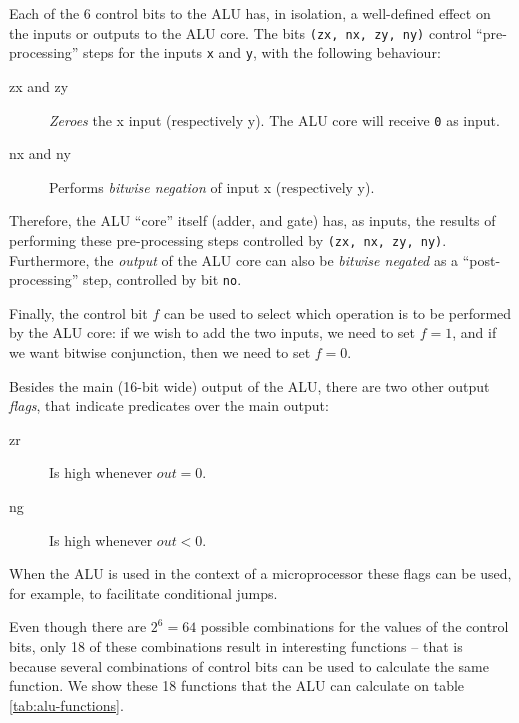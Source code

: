 \documentclass[a4paper]{article}
\begin{document}
            Each of the 6 control bits to the ALU has, in isolation, a well-defined effect on the
            inputs or outputs to the ALU core. The bits \texttt{(zx, nx, zy, ny)} control
            ``pre-processing'' steps for the inputs \texttt{x} and \texttt{y}, with the following
            behaviour:
            \begin{description}
                \item[zx and zy] \emph{Zeroes} the x input (respectively y). The ALU core will
                    receive \texttt{0} as input.
                \item[nx and ny] Performs \emph{bitwise negation} of input x (respectively y).
            \end{description}

            Therefore, the ALU ``core'' itself (adder, and gate) has, as inputs, the results of
            performing these pre-processing steps controlled by \texttt{(zx, nx, zy, ny)}.
            Furthermore, the \emph{output} of the ALU core can also be \emph{bitwise negated} as a
            ``post-processing'' step, controlled by bit \texttt{no}.

            Finally, the control bit $f$ can be used to select which operation is to be performed by
            the ALU core: if we wish to add the two inputs, we need to set $f = 1$, and if we want
            bitwise conjunction, then we need to set $f = 0$.

            Besides the main (16-bit wide) output of the ALU, there are two other output
            \emph{flags}, that indicate predicates over the main output:
            \begin{description}
                \item[zr] Is high whenever $out = 0$.
                \item[ng] Is high whenever $out < 0$.
            \end{description}

            When the ALU is used in the context of a microprocessor these flags can be used, for
            example, to facilitate conditional jumps.

            Even though there are $2^{6} = 64$ possible combinations for the values of the control
            bits, only 18 of these combinations result in interesting functions -- that is because
            several combinations of control bits can be used to calculate the same function. We show
            these 18 functions that the ALU can calculate on table \ref{tab:alu-functions}.
            
\end{document}
